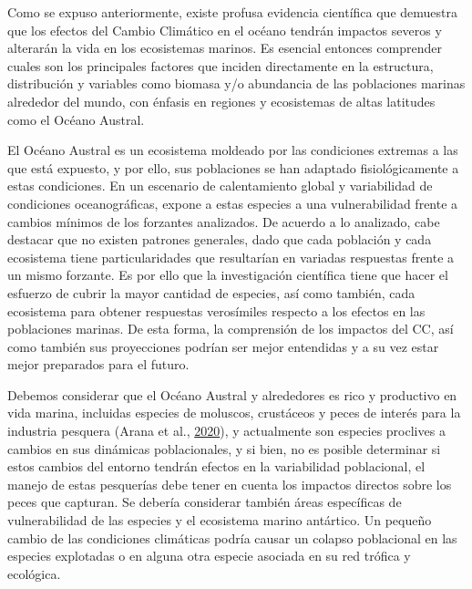 \documentclass[
]{article}
\begin{document}
Como se expuso anteriormente, existe profusa evidencia científica que
demuestra que los efectos del Cambio Climático en el océano tendrán
impactos severos y alterarán la vida en los ecosistemas marinos. Es
esencial entonces comprender cuales son los principales factores que
inciden directamente en la estructura, distribución y variables como
biomasa y/o abundancia de las poblaciones marinas alrededor del mundo,
con énfasis en regiones y ecosistemas de altas latitudes como el Océano
Austral.

El Océano Austral es un ecosistema moldeado por las condiciones extremas
a las que está expuesto, y por ello, sus poblaciones se han adaptado
fisiológicamente a estas condiciones. En un escenario de calentamiento
global y variabilidad de condiciones oceanográficas, expone a estas
especies a una vulnerabilidad frente a cambios mínimos de los forzantes
analizados. De acuerdo a lo analizado, cabe destacar que no existen
patrones generales, dado que cada población y cada ecosistema tiene
particularidades que resultarían en variadas respuestas frente a un
mismo forzante. Es por ello que la investigación científica tiene que
hacer el esfuerzo de cubrir la mayor cantidad de especies, así como
también, cada ecosistema para obtener respuestas verosímiles respecto a
los efectos en las poblaciones marinas. De esta forma, la comprensión de
los impactos del CC, así como también sus proyecciones podrían ser mejor
entendidas y a su vez estar mejor preparados para el futuro.

Debemos considerar que el Océano Austral y alrededores es rico y
productivo en vida marina, incluidas especies de moluscos, crustáceos y
peces de interés para la industria pesquera (Arana et al.,
\protect\hyperlink{ref-Arana2020b}{2020}), y actualmente son especies
proclives a cambios en sus dinámicas poblacionales, y si bien, no es
posible determinar si estos cambios del entorno tendrán efectos en la
variabilidad poblacional, el manejo de estas pesquerías debe tener en
cuenta los impactos directos sobre los peces que capturan. Se debería
considerar también áreas específicas de vulnerabilidad de las especies y
el ecosistema marino antártico. Un pequeño cambio de las condiciones
climáticas podría causar un colapso poblacional en las especies
explotadas o en alguna otra especie asociada en su red trófica y
ecológica.
\end{document}
